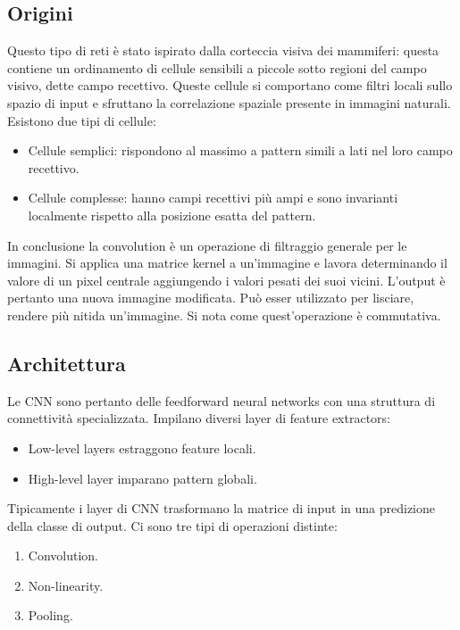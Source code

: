 	\subsection{Origini}
	Questo tipo di reti \`e stato ispirato dalla corteccia visiva dei mammiferi: questa contiene un ordinamento di cellule sensibili a piccole sotto regioni del campo visivo, dette campo recettivo.
	Queste cellule si comportano come filtri locali sullo spazio di input e sfruttano la correlazione spaziale presente in immagini naturali.
	Esistono due tipi di cellule:
	\begin{multicols}{2}
		\begin{itemize}
			\item Cellule semplici: rispondono al massimo a pattern simili a lati nel loro campo recettivo.
			\item Cellule complesse: hanno campi recettivi pi\`u ampi e sono invarianti localmente rispetto alla posizione esatta del pattern.
		\end{itemize}
	\end{multicols}
	In conclusione la convolution \`e un operazione di filtraggio generale per le immagini.
	Si applica una matrice kernel a un'immagine e lavora determinando il valore di un pixel centrale aggiungendo i valori pesati dei suoi vicini.
	L'output \`e pertanto una nuova immagine modificata.
	Pu\`o esser utilizzato per lisciare, rendere pi\`u nitida un'immagine.
	Si nota come quest'operazione \`e commutativa.

	\subsection{Architettura}
	Le CNN sono pertanto delle feedforward neural networks con una struttura di connettivit\`a specializzata.
	Impilano diversi layer di feature extractors:
	\begin{multicols}{2}
		\begin{itemize}
			\item Low-level layers estraggono feature locali.
			\item High-level layer imparano pattern globali.
		\end{itemize}
	\end{multicols}
	Tipicamente i layer di CNN trasformano la matrice di input in una predizione della classe di output.
	Ci sono tre tipi di operazioni distinte:
	\begin{multicols}{3}
		\begin{enumerate}
			\item Convolution.
			\item Non-linearity.
			\item Pooling.
		\end{enumerate}
	\end{multicols}

